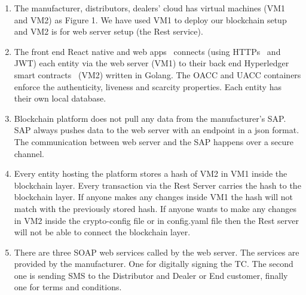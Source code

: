 \documentclass{article}
\begin{document}
\begin{enumerate}
\item
The manufacturer, distributors, dealers' cloud has virtual machines (VM1 and VM2) as Figure 1. We have used VM1 to deploy our blockchain setup and VM2 is for web server setup (the Rest service). 
\item
The front end React native and web apps~\cite{react} connects (using HTTPs~\cite{tls} and JWT) each entity via the web server (VM1) to their back end Hyperledger smart contracts~\cite{hlf} (VM2) written in Golang. The OACC and UACC containers enforce the authenticity, liveness and scarcity properties. Each entity has their own local database.
\item
Blockchain platform does not pull any data from the manufacturer's SAP. SAP always pushes data to the web server with an endpoint in a json format. The communication between web server and the SAP happens over a secure channel. 
\item
Every entity hosting the platform stores a hash of VM2 in VM1 inside the blockchain layer. 
Every transaction via the Rest Server carries the hash to the blockchain layer. If anyone makes any changes inside VM1 the hash will not match with the previously stored hash. If anyone wants to make any changes in VM2 inside the crypto-config file or in config.yaml file then the Rest server will not be able to connect the blockchain layer.
\item
There are three SOAP web services called by the web server. The services are provided by the manufacturer. One for digitally signing the TC. The second one is sending SMS to the Distributor and Dealer or End customer, finally one for terms and conditions.

\end{enumerate}
\end{document}
